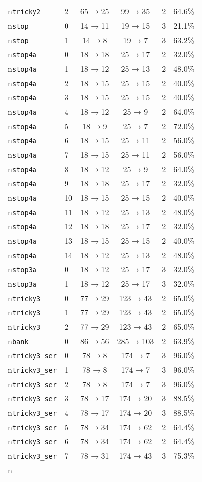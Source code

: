 \begin{tabular}{llcccc}
\\n\texttt{tricky2} & 2 & 65 → 25 & 99 → 35 & 2 & 64.6\% \\n\texttt{stop} & 0 & 14 → 11 & 19 → 15 & 3 & 21.1\% \\n\texttt{stop} & 1 & 14 → 8 & 19 → 7 & 3 & 63.2\% \\n\texttt{stop4a} & 0 & 18 → 18 & 25 → 17 & 2 & 32.0\% \\n\texttt{stop4a} & 1 & 18 → 12 & 25 → 13 & 2 & 48.0\% \\n\texttt{stop4a} & 2 & 18 → 15 & 25 → 15 & 2 & 40.0\% \\n\texttt{stop4a} & 3 & 18 → 15 & 25 → 15 & 2 & 40.0\% \\n\texttt{stop4a} & 4 & 18 → 12 & 25 → 9 & 2 & 64.0\% \\n\texttt{stop4a} & 5 & 18 → 9 & 25 → 7 & 2 & 72.0\% \\n\texttt{stop4a} & 6 & 18 → 15 & 25 → 11 & 2 & 56.0\% \\n\texttt{stop4a} & 7 & 18 → 15 & 25 → 11 & 2 & 56.0\% \\n\texttt{stop4a} & 8 & 18 → 12 & 25 → 9 & 2 & 64.0\% \\n\texttt{stop4a} & 9 & 18 → 18 & 25 → 17 & 2 & 32.0\% \\n\texttt{stop4a} & 10 & 18 → 15 & 25 → 15 & 2 & 40.0\% \\n\texttt{stop4a} & 11 & 18 → 12 & 25 → 13 & 2 & 48.0\% \\n\texttt{stop4a} & 12 & 18 → 18 & 25 → 17 & 2 & 32.0\% \\n\texttt{stop4a} & 13 & 18 → 15 & 25 → 15 & 2 & 40.0\% \\n\texttt{stop4a} & 14 & 18 → 12 & 25 → 13 & 2 & 48.0\% \\n\texttt{stop3a} & 0 & 18 → 12 & 25 → 17 & 3 & 32.0\% \\n\texttt{stop3a} & 1 & 18 → 12 & 25 → 17 & 3 & 32.0\% \\n\texttt{tricky3} & 0 & 77 → 29 & 123 → 43 & 2 & 65.0\% \\n\texttt{tricky3} & 1 & 77 → 29 & 123 → 43 & 2 & 65.0\% \\n\texttt{tricky3} & 2 & 77 → 29 & 123 → 43 & 2 & 65.0\% \\n\texttt{bank} & 0 & 86 → 56 & 285 → 103 & 2 & 63.9\% \\n\texttt{tricky3\_ser} & 0 & 78 → 8 & 174 → 7 & 3 & 96.0\% \\n\texttt{tricky3\_ser} & 1 & 78 → 8 & 174 → 7 & 3 & 96.0\% \\n\texttt{tricky3\_ser} & 2 & 78 → 8 & 174 → 7 & 3 & 96.0\% \\n\texttt{tricky3\_ser} & 3 & 78 → 17 & 174 → 20 & 3 & 88.5\% \\n\texttt{tricky3\_ser} & 4 & 78 → 17 & 174 → 20 & 3 & 88.5\% \\n\texttt{tricky3\_ser} & 5 & 78 → 34 & 174 → 62 & 2 & 64.4\% \\n\texttt{tricky3\_ser} & 6 & 78 → 34 & 174 → 62 & 2 & 64.4\% \\n\texttt{tricky3\_ser} & 7 & 78 → 31 & 174 → 43 & 3 & 75.3\% \\n\bottomrule
\end{tabular}
